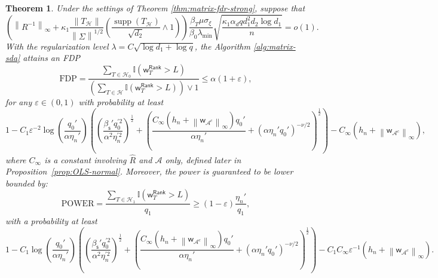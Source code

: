 \documentclass[12pt]{article}
\newcommand{\norm}[1]{\left\lVert#1\right\rVert}
\newcommand{\cH}{\mathcal{H}}
\newcommand{\bbI}{\mathbb{I}}
\def\wt{\widehat}
\def\sfw{\mathsf{w}}
\def\calA{{\mathcal A}}
\def\calH{{\mathcal H}}
\newtheorem{Theorem}{Theorem}
\theoremstyle{plain}
\begin{document}
\begin{Theorem}
Under the settings of Theorem \ref{thm:matrix-fdr-strong}, suppose that
\begin{equation*}
    \left(\norm{R^{-1}  }_\infty +\kappa_1 \frac{\norm{T_{\calH} } }{\norm{ \Sigma }^{1/2}}\left( \frac{\operatorname{supp}(T_{\calH} )}{\sqrt{d_2}}\wedge 1 \right)  \right)\frac{\beta_T \mu \sigma_\xi }{\beta_0 \lambda_{\min} }\sqrt{\frac{\kappa_1\alpha_d q d_1^2 d_2 \log d_1 }{n}}=o(1).
\end{equation*}
With the regularization level $\lambda=C\sqrt{\log d_1+\log q}$, the Algorithm \ref{alg:matrix-sda} attains an FDP 
\begin{equation*}
     \mathrm{FDP}=\frac{\sum_{T\in \cH_0  } \bbI(\sfw_{T}^{\mathsf{Rank}} >L ) }{\left( \sum_{T\in \cH  } \bbI(\sfw_T^{\mathsf{Rank}} >L ) \right) \vee 1 } \le \alpha(1+\varepsilon),
\end{equation*}
for any $\varepsilon\in(0,1)$ with probability at least 
\begin{equation*}
    1-C_1\varepsilon^{-2}\log(\frac{ q_{0}' }{\alpha \eta_n'})\left( \left(\frac{\beta_{\mathsf{s}}'  q_{0}^{'2} }{ \alpha^2\eta_n^{'2}}\right)^{\frac{1}{2}} + \left(\frac{C_\infty \left( h_n+\norm{ \sfw_{\calA^c} }_{\infty} \right)  q_{0}' }{\alpha \eta_n'} +(\alpha\eta_n'  q_{0}')^{-\nu/2} \right)^{\frac{1}{2}}\right)- C_\infty  \left( h_n+\norm{ \sfw_{\calA^c} }_{\infty} \right),
\end{equation*}
where $C_\infty$ is a constant involving $\wt R$ and $\calA$ only, defined later in Proposition~\ref{prop:OLS-normal}. Moreover, the power is guaranteed to be lower bounded by:
\begin{equation*}
   \mathrm{POWER}= \frac{\sum_{T\in \cH_1  } \bbI(\sfw_T^{\mathsf{Rank}} >L ) }{q_1} \ge (1-\varepsilon)\frac{\eta_n' }{q_1},
\end{equation*}
with a probability at least
\begin{equation*}
  1-C_1 \log(\frac{ q_{0}' }{\alpha \eta_n'})\left( \left(\frac{\beta_{\mathsf{s}}'  q_{0}^{'2} }{ \alpha^2\eta_n^{'2}}\right)^{\frac{1}{2}} + \left(\frac{C_\infty  \left( h_n+\norm{ \sfw_{\calA^c} }_{\infty} \right)  q_{0}'}{\alpha \eta_n'}+(\alpha\eta_n'  q_{0}')^{-\nu/2} \right)^{\frac{1}{2}}\right)- C_1 C_\infty  \varepsilon^{-1} \left( h_n+\norm{ \sfw_{\calA^c} }_{\infty} \right).
\end{equation*}
\end{Theorem}
\end{document}
